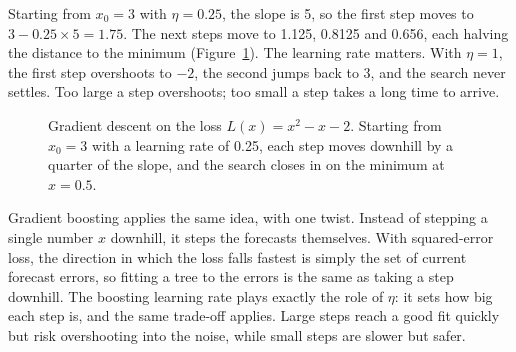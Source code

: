 Starting from $x_0 = 3$ with $\eta = 0.25$, the slope is 5, so the first step moves to $3 - 0.25 \times 5 = 1.75$. The next steps move to 1.125, 0.8125 and 0.656, each halving the distance to the minimum (Figure~\ref{fig:19-gd}). The learning rate matters. With $\eta = 1$, the first step overshoots to $-2$, the second jumps back to 3, and the search never settles. Too large a step overshoots; too small a step takes a long time to arrive.

\begin{figure}[htbp]
  \centering
  \caption{Gradient descent on the loss $L(x) = x^2 - x - 2$. Starting from
    $x_0 = 3$ with a learning rate of 0.25, each step moves downhill by a
    quarter of the slope, and the search closes in on the minimum at
    $x = 0.5$.}
  \label{fig:19-gd}
\end{figure}

Gradient boosting applies the same idea, with one twist. Instead of stepping a single number $x$ downhill, it steps the forecasts themselves. With squared-error loss, the direction in which the loss falls fastest is simply the set of current forecast errors, so fitting a tree to the errors is the same as taking a step downhill. The boosting learning rate plays exactly the role of $\eta$: it sets how big each step is, and the same trade-off applies. Large steps reach a good fit quickly but risk overshooting into the noise, while small steps are slower but safer.

